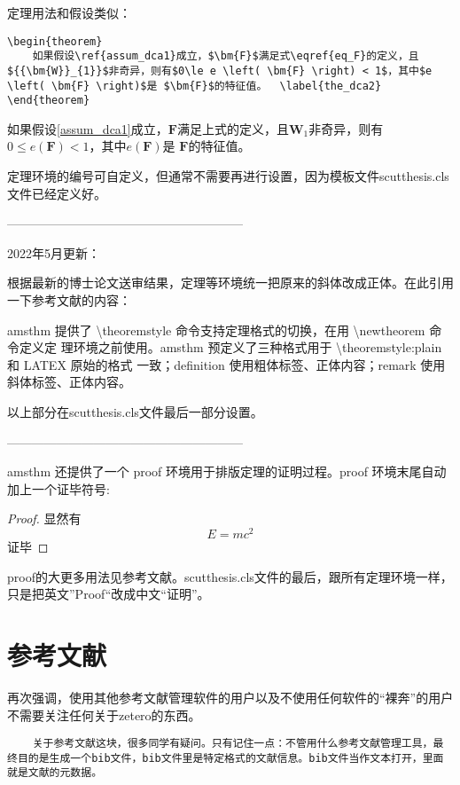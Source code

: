定理用法和假设类似：
\begin{lstlisting}
\begin{theorem}
	如果假设\ref{assum_dca1}成立，$\bm{F}$满足式\eqref{eq_F}的定义，且${{\bm{W}}_{1}}$非奇异，则有$0\le e \left( \bm{F} \right) < 1$，其中$e \left( \bm{F} \right)$是 $\bm{F}$的特征值。	\label{the_dca2}
\end{theorem}
\end{lstlisting}
\begin{theorem}
	如果假设\ref{assum_dca1}成立，$\bm{F}$满足上式的定义，且${{\bm{W}}_{1}}$非奇异，则有$0\le e \left( \bm{F} \right) < 1$，其中$e \left( \bm{F} \right)$是 $\bm{F}$的特征值。	\label{the_dca2}
\end{theorem}
\begin{remark}
	定理环境的编号可自定义，但通常不需要再进行设置，因为模板文件scutthesis.cls文件已经定义好。
\end{remark}

---------------------------------------------------------

2022年5月更新：

根据最新的博士论文送审结果，定理等环境统一把原来的斜体改成正体。在此引用一下参考文献\cite{_g}的内容：

amsthm 提供了 \textbackslash{}theoremstyle 命令支持定理格式的切换，在用 \textbackslash{}newtheorem 命令定义定 理环境之前使用。amsthm 预定义了三种格式用于 \textbackslash{}theoremstyle:plain 和 LATEX 原始的格式 一致；definition 使用粗体标签、正体内容；remark 使用斜体标签、正体内容。

以上部分在scutthesis.cls文件最后一部分设置。

---------------------------------------------------------

amsthm 还提供了一个 proof 环境用于排版定理的证明过程。proof 环境末尾自动加上一个证毕符号:
\begin{proof}
	显然有
	\[
	E=mc^2
	\]
	证毕
\end{proof}

proof的大更多用法见参考文献\cite{_g}。scutthesis.cls文件的最后，跟所有定理环境一样，只是把英文”Proof“改成中文“证明”。

\section{参考文献}

再次强调，使用其他参考文献管理软件的用户以及不使用任何软件的“裸奔”的用户不需要关注任何关于zetero的东西。
\begin{lstlisting}
	关于参考文献这块，很多同学有疑问。只有记住一点：不管用什么参考文献管理工具，最终目的是生成一个bib文件，bib文件里是特定格式的文献信息。bib文件当作文本打开，里面就是文献的元数据。
\end{lstlisting}

